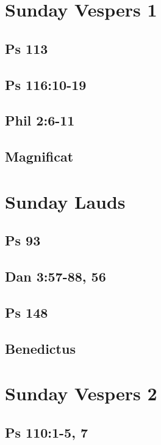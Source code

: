\section{Sunday Vespers 1}

\subsection{Ps 113}

\subsection{Ps 116:10-19}

\subsection{Phil 2:6-11}

\subsection{Magnificat}


\section{Sunday Lauds}

\subsection{Ps 93}

\subsection{Dan 3:57-88, 56}

\subsection{Ps 148}

\subsection{Benedictus}


\section{Sunday Vespers 2}

\subsection{Ps 110:1-5, 7}


